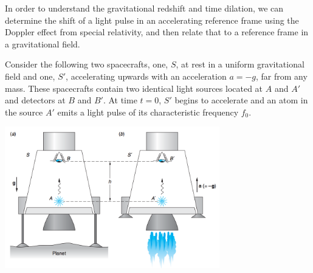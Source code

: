 \documentclass[12pt]{exam}
\begin{document}
\begin{questions}
	
\question In order to understand the gravitational redshift and time dilation, we can determine the shift of a light pulse in an accelerating reference frame using the Doppler effect from special relativity, and then relate that to a reference frame in a gravitational field.

Consider the following two spacecrafts, one, $S$, at rest in a uniform gravitational field and one, $S'$, accelerating upwards with an acceleration $a = -g$, far from any mass. These spacecrafts contain two identical light sources located at $A$ and $A'$ and detectors at $B$ and $B'$. At time $t=0$, $S'$ begins to accelerate and an atom in the source $A'$ emits a light pulse of its characteristic frequency $f_0$.
\begin{center}
				\includegraphics[width=0.7\textwidth]{../images/coop12_redshift.png}
\end{center}	
\end{questions}
\end{document}
